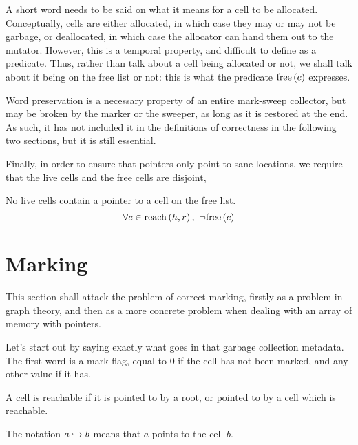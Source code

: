 A short word needs to be said on what it means for a cell to be
allocated. Conceptually, cells are either allocated, in which case
they may or may not be garbage, or deallocated, in which case the
allocator can hand them out to the mutator. However, this is a
temporal property, and difficult to define as a predicate. Thus,
rather than talk about a cell being allocated or not, we shall talk
about it being on the free list or not: this is what the predicate
$\free{c}$ expresses.

Word preservation is a necessary property of an entire mark-sweep
collector, but may be broken by the marker or the sweeper, as long as
it is restored at the end. As such, it has not included it in the
definitions of correctness in the following two sections, but it is
still essential.

Finally, in order to ensure that pointers only point to sane
locations, we require that the live cells and the free cells are
disjoint,

\begin{definition}
  \label{def:ms-live-cell-invariant}
  No live cells contain a pointer to a cell on the free list.
  \[\forall c \in \reach{h}{r},\ \lnot\free{c}\]
\end{definition}

\section{Marking}
\label{sec:marksweep-marking}

This section shall attack the problem of correct marking, firstly as a
problem in graph theory, and then as a more concrete problem when
dealing with an array of memory with pointers.

Let's start out by saying exactly what goes in that garbage collection
metadata. The first word is a mark flag, equal to 0 if the cell has
not been marked, and any other value if it has.

\begin{definition}[Reachable]
  \label{def:ms-reachable}
  A cell is reachable if it is pointed to by a root, or pointed to by
  a cell which is reachable.

  \begin{minipage}{.5\textwidth}
    \begin{prooftree}
    \end{prooftree}
  \end{minipage}
  \begin{minipage}{.5\textwidth}
    \begin{prooftree}
    \end{prooftree}
  \end{minipage}

  The notation $a \pointsto b$ means that $a$ points to the cell $b$.
\end{definition}

